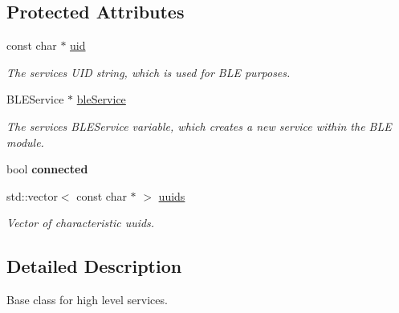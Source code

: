 \subsection*{Protected Attributes}
\begin{DoxyCompactItemize}
\item 
const char $\ast$ \hyperlink{class_bottle_buddy_1_1_embedded_1_1_pipeline_1_1_service_af290f9aa0a6dca36e802e615fab19f78}{uid}\hypertarget{class_bottle_buddy_1_1_embedded_1_1_pipeline_1_1_service_af290f9aa0a6dca36e802e615fab19f78}{}\label{class_bottle_buddy_1_1_embedded_1_1_pipeline_1_1_service_af290f9aa0a6dca36e802e615fab19f78}

\begin{DoxyCompactList}\small\item\em The service\textquotesingle{}s U\+ID string, which is used for B\+LE purposes. \end{DoxyCompactList}\item 
B\+L\+E\+Service $\ast$ \hyperlink{class_bottle_buddy_1_1_embedded_1_1_pipeline_1_1_service_a630b006fa103113e214455827c5f0b9b}{ble\+Service}\hypertarget{class_bottle_buddy_1_1_embedded_1_1_pipeline_1_1_service_a630b006fa103113e214455827c5f0b9b}{}\label{class_bottle_buddy_1_1_embedded_1_1_pipeline_1_1_service_a630b006fa103113e214455827c5f0b9b}

\begin{DoxyCompactList}\small\item\em The services B\+L\+E\+Service variable, which creates a new service within the B\+LE module. \end{DoxyCompactList}\item 
bool {\bfseries connected}\hypertarget{class_bottle_buddy_1_1_embedded_1_1_pipeline_1_1_service_a04c95502999a9d66577a016ba2bf39c7}{}\label{class_bottle_buddy_1_1_embedded_1_1_pipeline_1_1_service_a04c95502999a9d66577a016ba2bf39c7}

\item 
std\+::vector$<$ const char $\ast$ $>$ \hyperlink{class_bottle_buddy_1_1_embedded_1_1_pipeline_1_1_service_a543fc4a07564a076ffc2835510763e5f}{uuids}
\begin{DoxyCompactList}\small\item\em Vector of characteristic uuids. \end{DoxyCompactList}\end{DoxyCompactItemize}


\subsection{Detailed Description}
Base class for high level services. 

